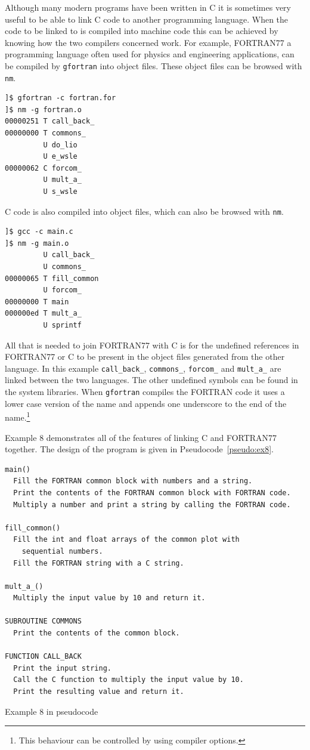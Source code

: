 \documentclass[11pt]{scrartcl}
\def\psc{Pseudocode}
\begin{document}
Although many modern programs have been written in C it is sometimes
very useful to be able to link C code to another programming language.  When the code to be linked to is compiled into machine code this can be achieved by knowing how the two compilers concerned work.  For example, FORTRAN77 a programming language often used for physics and engineering applications, can be compiled by \texttt{gfortran} into object files.  These object files can be browsed with \texttt{nm}.  
\begin{verbatim}
]$ gfortran -c fortran.for
]$ nm -g fortran.o 
00000251 T call_back_
00000000 T commons_
         U do_lio
         U e_wsle
00000062 C forcom_
         U mult_a_
         U s_wsle
\end{verbatim}
C code is also compiled into object files, which can also be browsed
with \texttt{nm}.
\begin{verbatim}
]$ gcc -c main.c 
]$ nm -g main.o
         U call_back_
         U commons_
00000065 T fill_common
         U forcom_
00000000 T main
000000ed T mult_a_
         U sprintf
\end{verbatim}
All that is needed to join FORTRAN77 with C is for the undefined
references in FORTRAN77 or C to be present in the object files
generated from the other language.  In this example
\texttt{call\_back\_}, \texttt{commons\_}, \texttt{forcom\_} and
\texttt{mult\_a\_} are linked between the two languages.  The other
undefined symbols can be found in the system libraries.  When
\texttt{gfortran} compiles the FORTRAN code it uses a lower case version of
the name and appends one underscore to  the end of the name.\footnote{This
behaviour can be controlled by using compiler options.}

Example 8 demonstrates all of the features of linking C and FORTRAN77
together.  The design of the program is given in \psc~\ref{pseudo:ex8}.

\begin{pseudocode}[h]
\begin{verbatim}
main()
  Fill the FORTRAN common block with numbers and a string.
  Print the contents of the FORTRAN common block with FORTRAN code.
  Multiply a number and print a string by calling the FORTRAN code.

fill_common()
  Fill the int and float arrays of the common plot with 
    sequential numbers.
  Fill the FORTRAN string with a C string.

mult_a_()
  Multiply the input value by 10 and return it.

SUBROUTINE COMMONS
  Print the contents of the common block.

FUNCTION CALL_BACK
  Print the input string.
  Call the C function to multiply the input value by 10.
  Print the resulting value and return it.
\end{verbatim}
\caption{Example 8 in pseudocode \label{pseudo:ex8}}
\end{pseudocode}
\end{document}
